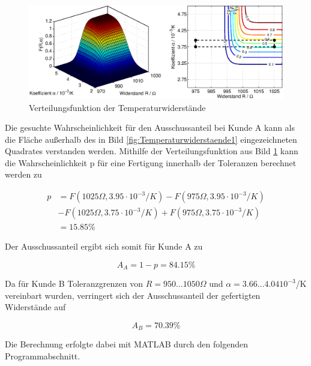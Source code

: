 \noindent 
\begin{figure}[H]
  \centerline{\includegraphics[width=1\textwidth]{Kapitel8/Bilder/image18}}
  \caption{Verteilungsfunktion der Temperaturwiderst\"{a}nde}
  \label{fig:Temperaturwiderstaende2}
\end{figure}

\noindent Die gesuchte Wahrscheinlichkeit f\"{u}r den Ausschussanteil bei Kunde A kann als die Fl\"{a}che au{\ss}erhalb des in Bild \ref{fig:Temperaturwiderstaende1} eingezeichneten Quadrates verstanden werden. Mithilfe der Verteilungsfunktion aus Bild \ref{fig:Temperaturwiderstaende2} kann die Wahrscheinlichkeit p f\"{u}r eine Fertigung innerhalb der Toleranzen berechnet werden zu 

\begin{equation}\label{eq:eighteightynine}
\begin{split}
p & =F\left(1025 \Omega ,3.95\cdot 10^{-3} /K\right)-F\left(975 \Omega ,3.95\cdot 10^{-3} /K\right) \\
& -F\left(1025 \Omega ,3.75\cdot 10^{-3} /K\right)+F\left(975 \Omega ,3.75\cdot 10^{-3} /K\right) \\ 
& =15.85\%
\end{split}
\end{equation}

\noindent Der Ausschussanteil ergibt sich somit f\"{u}r Kunde A zu

\begin{equation}\label{eq:eightninety}
A_{A} =1-p=84.15\%
\end{equation}

\noindent Da f\"{u}r Kunde B Toleranzgrenzen von $R = 950 \dots 1050 \Omega$ und $\alpha = 3.66 \dots 4.04 10^{-3}$/K vereinbart wurden, verringert sich der Ausschussanteil der gefertigten Widerst\"{a}nde auf

\begin{equation}\label{eq:eightninetyone}
A_{B} =70.39\%
\end{equation}

\noindent Die Berechnung erfolgte dabei mit MATLAB durch den folgenden Programmabschnitt.


